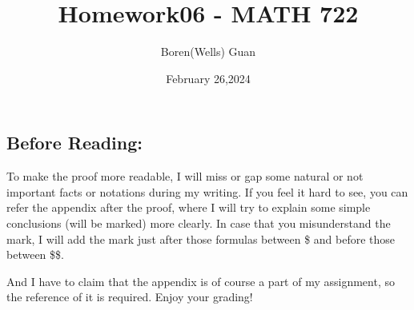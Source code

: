 \documentclass[lang=en,11pt,a4paper,citestyle =authoryear]{elegantpaper}
\title{Homework06 - MATH 722}
\author{Boren(Wells) Guan}
\date{February 26,2024}
\begin{document}
\maketitle

\subsection*{Before Reading:}\par
To make the proof more readable, I will miss or gap some natural or not important facts or notations during my writing. If you feel it hard to see, you can refer the appendix after the proof, where I will try to explain some simple conclusions (will be marked) more clearly. In case that you misunderstand the mark, I will add the mark just after those formulas between \$ and before those between \$\$.\par
And I have to claim that the appendix is of course a part of my assignment, so the reference of it is required. Enjoy your grading!
\end{document}
